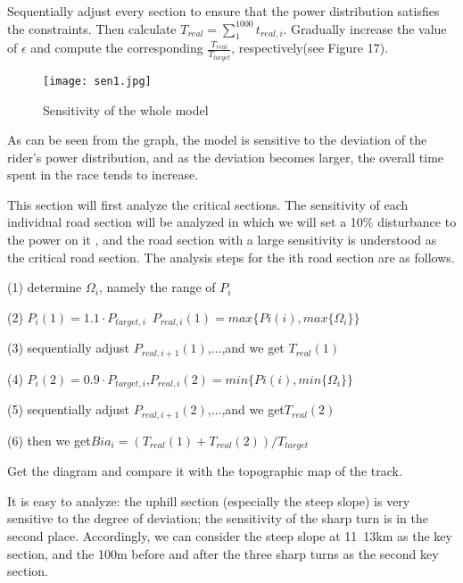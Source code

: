 \documentclass{mcmthesis}
\begin{document}
Sequentially adjust every section to ensure that the power distribution satisfies the constraints. Then calculate $T_{real}=\sum_{1}^{1000} t_{real,i}$. Gradually increase the value of $\epsilon$ and compute the corresponding $\frac{T_{real}}{T_{target}}$, respectively(see Figure 17).
 \begin{figure}[h]
	\small
	\centering
	\texttt{[image: sen1.jpg]}
	\caption{Sensitivity of the whole model} 
\end{figure}

As can be seen from the graph, the model is sensitive to the deviation of the rider's power distribution, and as the deviation becomes larger, the overall time spent in the race tends to increase.

This section will first analyze the critical sections.
The sensitivity of each individual road section will be analyzed in which we will set a 10\% disturbance to the power on it , and the road section with a large sensitivity is understood as the critical road section.
The analysis steps for the ith road section are as follows.


(1) determine $\Omega_i$, namely the range of $P_i$
	
(2) $P_i(1)=1.1\cdot P_{target,i}$ $P_{real,i}(1)=max\{Pi(i),max\{\Omega_i\}\}$
	
(3) sequentially adjust $P_{real,i+1}(1)$,...,and we get $T_{real}(1)$
	
(4) $P_{i}(2)=0.9\cdot P_{target,i}$,$P_{real,i}(2)=min\{Pi(i),min\{\Omega_i\}\}$
	
(5) sequentially adjust $P_{real,i+1}(2)$,...,and we get$T_{real}(2)$
	
(6) then we get${Bia}_i=(T_{real}(1)+T_{real}(2))/T_{target}$


Get the diagram and compare it with the topographic map of the track.
 \begin{figure}[h]
	\centering
	\caption{}
\end{figure}


It is easy to analyze: the uphill section (especially the steep slope) is very sensitive to the degree of deviation; the sensitivity of the sharp turn is in the second place.
Accordingly, we can consider the steep slope at 11~13km as the key section, and the 100m before and after the three sharp turns as the second key section.
\end{document}
